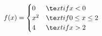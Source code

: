 \documentclass[preview]{standalone}
\begin{document}
\begin{align*}
f( x ) = \begin{cases} 0 & \te x t{if }  x  < 0 \\  x ^2 & \te x t{if } 0 \leq  x  \leq 2 \\ 4 & \te x t{if }  x  > 2 \end{cases}
\end{align*}
\end{document}
